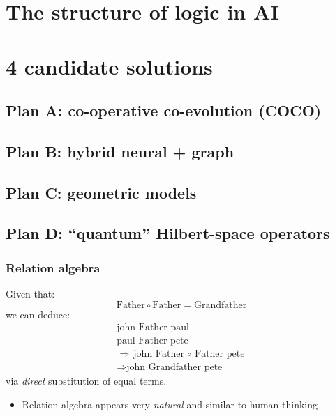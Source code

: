 \documentclass{beamer}
\begin{document}
\section{The structure of logic in AI}

\section{4 candidate solutions}

\subsection{Plan A: co-operative co-evolution (COCO)}

\subsection{Plan B: hybrid neural + graph}

\subsection{Plan C: geometric models}

\subsection{Plan D: ``quantum'' Hilbert-space operators}

\begin{frame}
\frametitle{Relation algebra}
Given that:
\begin{equation}
\mbox{Father} \circ \mbox{Father} = \mbox{Grandfather}
\end{equation}
we can deduce:
\begin{eqnarray}
\mbox{john Father paul} \\
\mbox{paul Father pete} \\
\Rightarrow \mbox{john Father $\circ$ Father pete} \\
\Rightarrow \mbox{john Grandfather pete}
\end{eqnarray}
via \textit{direct} substitution of equal terms.
\begin{itemize}
	\item  Relation algebra appears very \textit{natural} and similar to human thinking
\end{itemize}
\end{frame}


\end{document}
